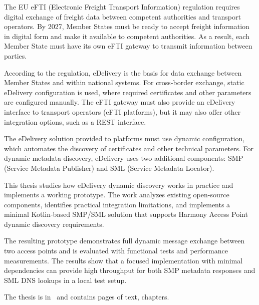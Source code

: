 The EU eFTI (Electronic Freight Transport Information) regulation requires digital exchange of freight data
between competent authorities and transport operators. By 2027, Member States must be ready to accept
freight information in digital form and make it available to competent authorities.
As a result, each Member State must have its own eFTI gateway to transmit information between parties.

According to the regulation, eDelivery is the basis for data exchange between Member States and within national systems.
For cross-border exchange, static eDelivery configuration is used,
where required certificates and other parameters are configured manually.
The eFTI gateway must also provide an eDelivery interface to transport operators (eFTI platforms),
but it may also offer other integration options, such as a REST interface.

The eDelivery solution provided to platforms must use dynamic configuration, which automates
the discovery of certificates and other technical parameters.
For dynamic metadata discovery, eDelivery uses two additional components:
SMP (Service Metadata Publisher) and SML (Service Metadata Locator).

This thesis studies how eDelivery dynamic discovery works in practice and implements a working prototype.
The work analyzes existing open-source components, identifies practical integration limitations,
and implements a minimal Kotlin-based SMP/SML solution that supports Harmony Access Point
dynamic discovery requirements.

The resulting prototype demonstrates full dynamic message exchange between two access points and is evaluated
with functional tests and performance measurements. The results show that a focused implementation with minimal
dependencies can provide high throughput for both SMP metadata responses and SML DNS lookups in a local test setup.


The thesis is in \langEng~and contains \calculatepages pages of text, 
 chapters.
